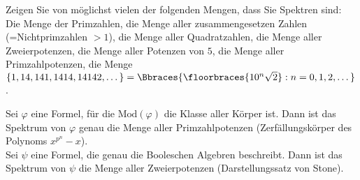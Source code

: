 
\begin{exercise}[75]

\phantom{}
	Zeigen Sie von möglichst vielen der folgenden Mengen, dass Sie Spektren sind: Die Menge der Primzahlen, die Menge aller zusammengesetzen Zahlen (=Nichtprimzahlen $> 1$), die Menge aller Quadratzahlen, die Menge aller Zweierpotenzen, die Menge aller Potenzen von $5$, die Menge aller Primzahlpotenzen, die Menge $\{1, 14, 141, 1414, 14142, \dots \} = \Bbraces{\floorbraces{10^n \sqrt{2}} : n = 0, 1, 2, \dots}$.

\end{exercise}


\begin{solution}

Sei $\varphi$ eine Formel, für die $\mathrm{Mod}(\varphi)$ die Klasse aller Körper ist.
Dann ist das Spektrum von $\varphi$ genau die Menge aller Primzahlpotenzen
(Zerfällungskörper des Polynoms $x^{p^n}- x$). \\
Sei $\psi$ eine Formel, die genau die Booleschen Algebren beschreibt.
Dann ist das Spektrum von $\psi$ die Menge aller Zweierpotenzen (Darstellungssatz von Stone).

\end{solution}

